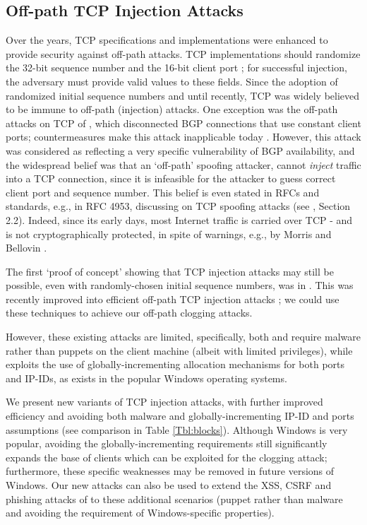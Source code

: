 \documentclass[conference]{IEEEtran}
\begin{document}
\subsection{Off-path TCP Injection Attacks}
Over the years, TCP specifications and implementations were enhanced to provide security against off-path attacks.
TCP implementations should randomize the 32-bit sequence number \cite{rfc1948} and the 16-bit client port \cite{rfc6056}; for successful injection, the adversary must provide valid values to these fields. 
Since the adoption of randomized initial sequence numbers and until recently, TCP was widely believed to be immune to off-path (injection) attacks. One exception was the off-path attacks on TCP of \cite{watson2004slipping}, which disconnected BGP connections that use constant client ports; countermeasures make this attack inapplicable today \cite{rfc4987}. However, this attack was considered as reflecting a very specific vulnerability of BGP availability, and 
the widespread belief was that an `off-path' spoofing attacker, cannot {\em inject} traffic into a TCP connection, since it is infeasible for the attacker to guess correct client port and sequence number. This belief is even stated in RFCs and standards, e.g., in RFC 4953, discussing on TCP spoofing attacks (see \cite{rfc4953}, Section 2.2). Indeed, since its early days, most Internet traffic is carried over TCP - and is not cryptographically protected, in spite of warnings, e.g., by Morris  \cite{Morris85} and Bellovin \cite{Bellovin:security:problems:in:TCP,Bellovin:Look:Back:at:TCP:IP:Security}. 

The first `proof of concept' showing that TCP injection attacks may still be possible, even with randomly-chosen initial sequence numbers, was in \cite{lkm:phrack:07}. 
This was recently improved into 
efficient off-path TCP injection attacks \cite{snptcp,woottcp,CCS12:tcp}; we could use these techniques to achieve our off-path clogging attacks. 

However, these existing attacks are limited, specifically, both \cite{snptcp} and \cite{CCS12:tcp} require malware rather than puppets on the client machine (albeit with limited privileges), 
while \cite{woottcp} exploits the use of globally-incrementing allocation mechanisms for both ports and IP-IDs, as exists in the popular Windows operating systems. 

We present new variants of TCP injection attacks, with further improved efficiency and avoiding both malware and globally-incrementing IP-ID and ports assumptions (see comparison in Table \ref{Tbl:blocks}). 
Although Windows is very popular, avoiding the globally-incrementing requirements still significantly expands the base of clients which can be exploited for the clogging attack; furthermore, these specific weaknesses may be removed in future versions of Windows. 
Our new attacks can also be used to extend the XSS, CSRF and phishing attacks of  \cite{snptcp,woottcp,CCS12:tcp} to these additional scenarios (puppet rather than malware and avoiding the requirement of Windows-specific properties).
\end{document}
